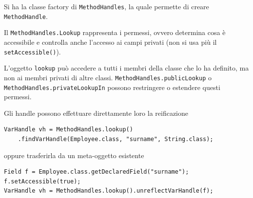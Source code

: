 Si ha la classe factory di \texttt{MethodHandles}, la quale permette di creare \texttt{MethodHandle}.

Il \texttt{MethodHandles.Lookup} rappresenta i permessi, ovvero determina cosa è accessibile e controlla anche l'accesso ai campi privati (non si usa più il \texttt{setAccessible()}).

L'oggetto \texttt{lookup} può accedere a tutti i membri della classe che lo ha definito, ma non ai membri privati di altre classi. \texttt{MethodHandles.publicLookup} o \texttt{MethodHandles.privateLookupIn} possono restringere o estendere questi permessi.

Gli handle possono effettuare direttamente loro la reificazione
\begin{verbatim}
VarHandle vh = MethodHandles.lookup()
    .findVarHandle(Employee.class, "surname", String.class);
\end{verbatim}
oppure trasferirla da un meta-oggetto esistente
\begin{verbatim}
Field f = Employee.class.getDeclaredField("surname");
f.setAccessible(true);
VarHandle vh = MethodHandles.lookup().unreflectVarHandle(f);
\end{verbatim}

